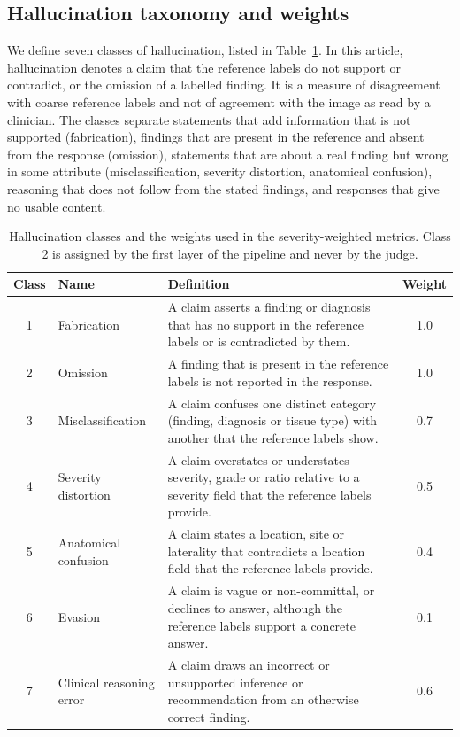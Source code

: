 \documentclass[11pt,a4paper]{article}
\begin{document}
\subsection{Hallucination taxonomy and weights}\label{sec:taxonomy}
We define seven classes of hallucination, listed in Table~\ref{tab:taxonomy}. In this article, hallucination denotes a claim that the reference labels do not support or contradict, or the omission of a labelled finding. It is a measure of disagreement with coarse reference labels and not of agreement with the image as read by a clinician. The classes separate statements that add information that is not supported (fabrication), findings that are present in the reference and absent from the response (omission), statements that are about a real finding but wrong in some attribute (misclassification, severity distortion, anatomical confusion), reasoning that does not follow from the stated findings, and responses that give no usable content.

\begin{table}[tbp]
  \centering
  \caption{Hallucination classes and the weights used in the severity-weighted metrics. Class 2 is assigned by the first layer of the pipeline and never by the judge.}
  \label{tab:taxonomy}
  \small
  \begin{tabular}{@{}clp{8.6cm}c@{}}
    \toprule
    Class & Name & Definition & Weight\\
    \midrule
    1 & Fabrication & A claim asserts a finding or diagnosis that has no support in the reference labels or is contradicted by them. & 1.0\\
    2 & Omission & A finding that is present in the reference labels is not reported in the response. & 1.0\\
    3 & Misclassification & A claim confuses one distinct category (finding, diagnosis or tissue type) with another that the reference labels show. & 0.7\\
    4 & Severity distortion & A claim overstates or understates severity, grade or ratio relative to a severity field that the reference labels provide. & 0.5\\
    5 & Anatomical confusion & A claim states a location, site or laterality that contradicts a location field that the reference labels provide. & 0.4\\
    6 & Evasion & A claim is vague or non-committal, or declines to answer, although the reference labels support a concrete answer. & 0.1\\
    7 & Clinical reasoning error & A claim draws an incorrect or unsupported inference or recommendation from an otherwise correct finding. & 0.6\\
    \bottomrule
  \end{tabular}
\end{table}
\end{document}
